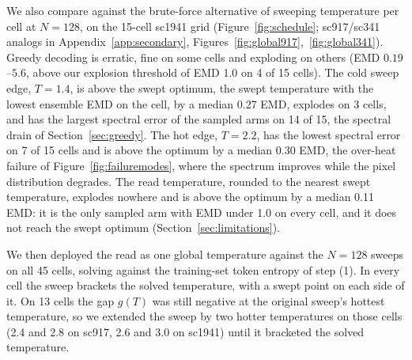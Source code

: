 \documentclass{article}
\begin{document}
We also compare against the brute-force alternative of sweeping temperature per cell at
$N{=}128$, on the 15-cell sc1941 grid (Figure~\ref{fig:schedule}; sc917/sc341 analogs in
Appendix~\ref{app:secondary}, Figures~\ref{fig:global917},~\ref{fig:global341}). Greedy
decoding is erratic, fine on some cells and exploding on others (EMD $0.19$--$5.6$, above
our explosion threshold of EMD 1.0 on 4 of 15 cells). The cold sweep edge, $T{=}1.4$, is above
the swept optimum, the swept temperature with the lowest ensemble EMD on the cell, by a
median 0.27 EMD, explodes on 3 cells, and has the largest spectral error of
the sampled arms on 14 of 15, the spectral drain of Section~\ref{sec:greedy}. The hot
edge, $T{=}2.2$, has the lowest spectral error on 7 of 15 cells and is above the optimum
by a median 0.30 EMD, the over-heat failure of Figure~\ref{fig:failuremodes}, where the
spectrum improves while the pixel distribution degrades. The read temperature, rounded
to the nearest swept temperature, explodes nowhere and is above the optimum by a median
0.11 EMD: it is the only sampled arm with EMD under 1.0 on every cell, and it does not
reach the swept optimum (Section~\ref{sec:limitations}).

We then deployed the read as one global temperature against the $N{=}128$ sweeps on all
45 cells, solving against the training-set token entropy of step (1). In every cell the
sweep brackets the solved temperature, with a swept point on each side of it. On 13 cells the gap $g(T)$ was still negative at the original sweep's
hottest temperature, so we extended the sweep by two hotter temperatures on those cells
(2.4 and 2.8 on sc917, 2.6 and 3.0 on sc1941) until it bracketed the solved temperature.
\end{document}
